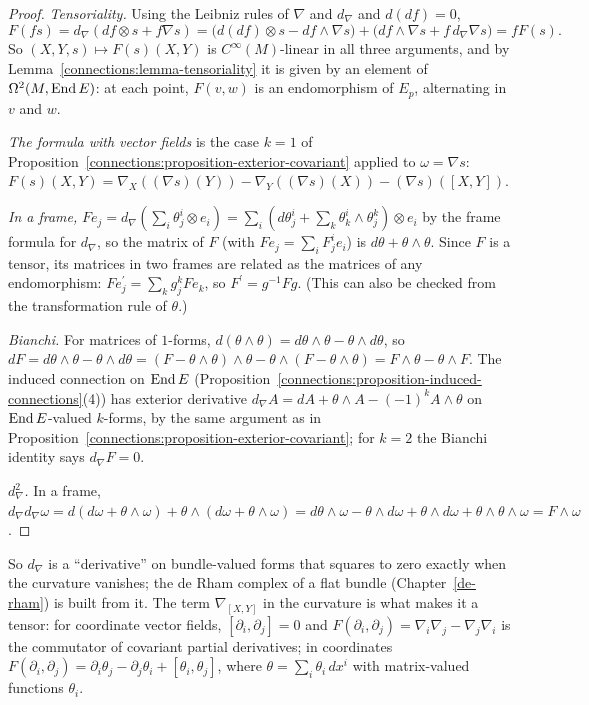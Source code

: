 \begin{proof}
\emph{Tensoriality.} Using the Leibniz rules of $\nabla$ and $d_\nabla$ and $d(df) = 0$,
\[
F(fs) = d_\nabla(df \otimes s + f\nabla s) = \bigl(d(df) \otimes s - df \wedge \nabla s\bigr) + \bigl(df \wedge \nabla s + f\,d_\nabla\nabla s\bigr) = fF(s).
\]
So $(X, Y, s) \mapsto F(s)(X, Y)$ is $C^\infty(M)$-linear in all three arguments, and by Lemma~\ref{connections:lemma-tensoriality} it is given by an element of
$\Omega^2(M, \operatorname{End} E)$: at each point, $F(v, w)$ is an endomorphism of $E_p$, alternating in $v$ and $w$.

\emph{The formula with vector fields} is the case $k = 1$ of Proposition~\ref{connections:proposition-exterior-covariant} applied to $\omega = \nabla s$:
$F(s)(X, Y) = \nabla_X((\nabla s)(Y)) - \nabla_Y((\nabla s)(X)) - (\nabla s)([X, Y])$.

\emph{In a frame,} $Fe_j = d_\nabla(\sum_i\theta^i_j \otimes e_i) = \sum_i(d\theta^i_j + \sum_k\theta^i_k \wedge \theta^k_j) \otimes e_i$ by the frame formula for $d_\nabla$, so the matrix of $F$
(with $Fe_j = \sum_iF^i_je_i$) is $d\theta + \theta \wedge \theta$. Since $F$ is a tensor, its matrices in two frames are related as the matrices of any endomorphism:
$Fe^{\prime}_j = \sum_kg^k_jFe_k$, so $F^{\prime} = g^{-1}Fg$. (This can also be checked from the transformation rule of $\theta$.)

\emph{Bianchi.} For matrices of $1$-forms, $d(\theta \wedge \theta) = d\theta \wedge \theta - \theta \wedge d\theta$, so
$dF = d\theta \wedge \theta - \theta \wedge d\theta = (F - \theta \wedge \theta) \wedge \theta - \theta \wedge (F - \theta \wedge \theta) = F \wedge \theta - \theta \wedge F$. The induced
connection on $\operatorname{End} E$ (Proposition~\ref{connections:proposition-induced-connections}(4)) has exterior derivative $d_\nabla A = dA + \theta \wedge A - (-1)^kA \wedge \theta$ on
$\operatorname{End} E$-valued $k$-forms, by the same argument as in Proposition~\ref{connections:proposition-exterior-covariant}; for $k = 2$ the Bianchi identity says $d_\nabla F = 0$.

\emph{$d_\nabla^2$.} In a frame, $d_\nabla d_\nabla\omega = d(d\omega + \theta \wedge \omega) + \theta \wedge (d\omega + \theta \wedge \omega) = d\theta \wedge \omega - \theta \wedge d\omega + \theta \wedge d\omega
+ \theta \wedge \theta \wedge \omega = F \wedge \omega$.
\end{proof}

So $d_\nabla$ is a ``derivative'' on bundle-valued forms that squares to zero exactly when the curvature vanishes; the de Rham complex of a flat bundle (Chapter~\ref{de-rham})
is built from it. The term $\nabla_{[X, Y]}$ in the curvature is what makes it a tensor: for coordinate vector fields, $[\partial_i, \partial_j] = 0$ and
$F(\partial_i, \partial_j) = \nabla_i\nabla_j - \nabla_j\nabla_i$ is the commutator of covariant partial derivatives; in coordinates
$F(\partial_i, \partial_j) = \partial_i\theta_j - \partial_j\theta_i + [\theta_i, \theta_j]$, where $\theta = \sum_i\theta_i\,dx^i$ with matrix-valued functions $\theta_i$.

